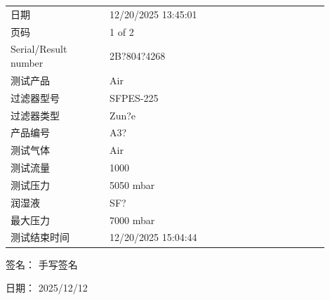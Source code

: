 \documentclass[UTF8,10pt,a4paper,fontset=fandol]{ctexart}
\newcommand{\fieldvalue}[1]{#1}
\newcommand{\handwritten}[1]{#1}
\begin{document}
\begin{tabular}{@{}p{0.28\linewidth}p{0.62\linewidth}@{}}
日期 &
\fieldvalue{12/20/2025 13:45:01}
\\[2pt]
页码 &
\fieldvalue{1 of 2}
\\[2pt]
Serial/Result number &
\fieldvalue{2B?804?4268}
\\[2pt]
测试产品 &
\fieldvalue{Air}
\\[2pt]
过滤器型号 &
\fieldvalue{SFPES-225}
\\[2pt]
过滤器类型 &
\fieldvalue{Zun?e}
\\[2pt]
产品编号 &
\fieldvalue{A3?}
\\[2pt]
测试气体 &
\fieldvalue{Air}
\\[2pt]
测试流量 &
\fieldvalue{1000}
\\[2pt]
测试压力 &
\fieldvalue{5050 mbar}
\\[2pt]
润湿液 &
\fieldvalue{SF?}
\\[2pt]
最大压力 &
\fieldvalue{7000 mbar}
\\[2pt]
测试结束时间 &
\fieldvalue{12/20/2025 15:04:44}
\end{tabular}

\vspace{1em}

\noindent 签名：%
\fieldvalue{\handwritten{手写签名}}

\noindent 日期：%
\fieldvalue{\handwritten{2025/12/12}}

\vspace{1em}
\end{document}
